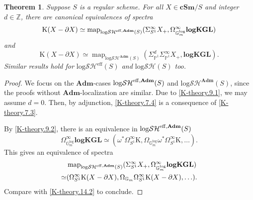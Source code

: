 \documentclass[11pt, a4paper]{amsart}
\newtheorem{thm}{Theorem}[subsection]
\theoremstyle{definition}
\numberwithin{equation}{subsection}
\renewcommand{\P}{\mathbb{P}}
\newcommand{\cSm}{\mathbf{cSm}}
\newcommand{\Adm}{\mathbf{Adm}}
\newcommand{\Kth}{\mathrm{K}}
\newcommand{\logKGL}{\mathbf{logKGL}}
\newcommand{\Gmm}{\mathbb{G}_m^{\mathrm{log}}}
\newcommand{\eff}{{\rm eff}}
\newcommand{\inflogSH}{\mathrm{log}\mathcal{SH}}
\newcommand{\inflogSHS}{\mathrm{log}\mathcal{SH}^{\mathrm{eff}}}
\newcommand{\map}{\operatorname{map}}
\begin{document}
\begin{thm}
\label{K-theory.7}
Suppose $S$ is a regular scheme.
For all $X\in \cSm/S$ and integer $d\in\mathbb{Z}$, there are canonical equivalences of spectra
\begin{equation}
\label{K-theory.7.3}
\Kth(X-\partial X)
\simeq
\map_{{\inflogSH}^{\eff, \Adm}(S)}(\Sigma_{S^1}^\infty X_+,\Omega_{\Gmm}^\infty \logKGL)
\end{equation}
and
\begin{equation}
\label{K-theory.7.4}
\Kth(X-\partial X)
\simeq
\map_{\inflogSH^\Adm(S)}(\Sigma_{\P^1}^d \Sigma_{\P^1}^\infty X_+,\logKGL).
\end{equation}
Similar results hold for $\inflogSHS(S)$ and $\inflogSH(S)$ too.
\end{thm}
\begin{proof}
We focus on the $\Adm$-cases ${\inflogSH}^{\eff,\Adm}(S)$ and ${\inflogSH}^{\Adm}(S)$, since the proofs without $\Adm$-localization are similar.
Due to \eqref{K-theory.9.1}, we may assume $d=0$.
Then, by adjunction, \eqref{K-theory.7.4} is a consequence of \eqref{K-theory.7.3}.

By \eqref{K-theory.9.2}, there is an equivalence in ${\inflogSH}^{\eff,\Adm}(S)$
\begin{equation}
\label{K-theory.7.5}
\Omega_{\Gmm}^\infty \logKGL
\simeq
(\omega^*\Omega_{S^1}^\infty \Kth,\Omega_{\Gmm}\omega^*\Omega_{S^1}^\infty \Kth,\ldots).
\end{equation}
This gives an equivalence of spectra
\begin{equation}
\label{K-theory.7.1}
\begin{split}
& \map_{{\inflogSH}^{\eff,\Adm}(S)}(\Sigma_{S^1}^\infty X_+,\Omega_{\Gmm}^\infty\logKGL)
\\
\simeq &
(\Omega_{S^1}^\infty \Kth(X-\partial X),\Omega_{\mathbb{G}_m}\Omega_{S^1}^\infty \Kth(X-\partial X),\ldots).
\end{split}
\end{equation}
Compare with \eqref{K-theory.14.2} to conclude.
\end{proof}
\end{document}
